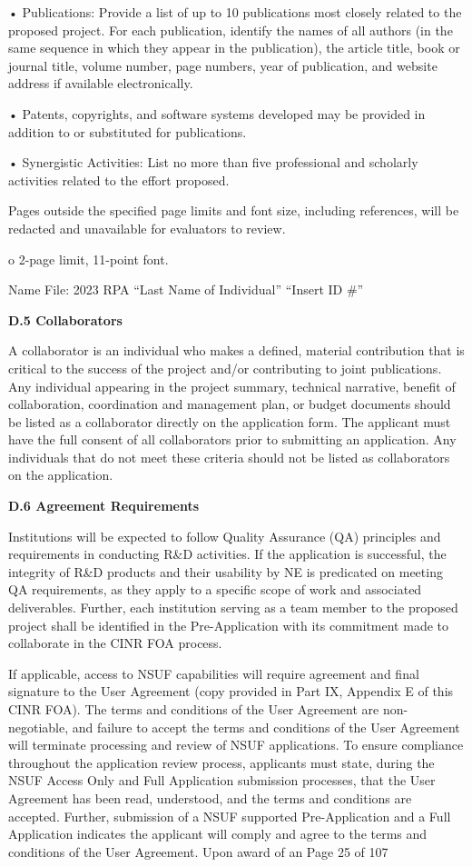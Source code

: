 • Publications: Provide a list of up to 10 publications most closely related to
the proposed project. For each publication, identify the names of all authors
(in the same sequence in which they appear in the publication), the article
title, book or journal title, volume number, page numbers, year of publication,
and website address if available electronically.

• Patents, copyrights, and software systems developed may be provided in
addition to or substituted for publications.

• Synergistic Activities: List no more than five professional and scholarly
activities related to the effort proposed.

Pages outside the specified page limits and font size, including references,
will be redacted and unavailable for evaluators to review.

o 2-page limit, 11-point font.

Name File: 2023 RPA “Last Name of Individual” “Insert ID \#”

{\bf D.5 Collaborators}

A collaborator is an individual who makes a defined, material contribution that
is critical to the success of the project and/or contributing to joint
publications. Any individual appearing in the project summary, technical
narrative, benefit of collaboration, coordination and management plan, or
budget documents should be listed as a collaborator directly on the application
form. The applicant must have the full consent of all collaborators prior to
submitting an application. Any individuals that do not meet these criteria
should not be listed as collaborators on the application.


{\bf D.6 Agreement Requirements}

Institutions will be expected to follow Quality Assurance (QA) principles and
requirements in conducting R\&D activities. If the application is successful,
the integrity of R\&D products and their usability by NE is predicated on
meeting QA requirements, as they apply to a specific scope of work and
associated deliverables. Further, each institution serving as a team member to
the proposed project shall be identified in the Pre-Application with its
commitment made to collaborate in the CINR FOA process.

If applicable, access to NSUF capabilities will require agreement and final
signature to the User Agreement (copy provided in Part IX, Appendix E of this
CINR FOA). The terms and conditions of the User Agreement are non-negotiable,
and failure to accept the terms and conditions of the User Agreement will
terminate processing and review of NSUF applications. To ensure compliance
throughout the application review process, applicants must state, during the
NSUF Access Only and Full Application submission processes, that the User
Agreement has been read, understood, and the terms and conditions are accepted.
Further, submission of a NSUF supported Pre-Application and a Full Application
indicates the applicant will comply and agree to the terms and conditions of
the User Agreement. Upon award of an Page 25 of 107
 
